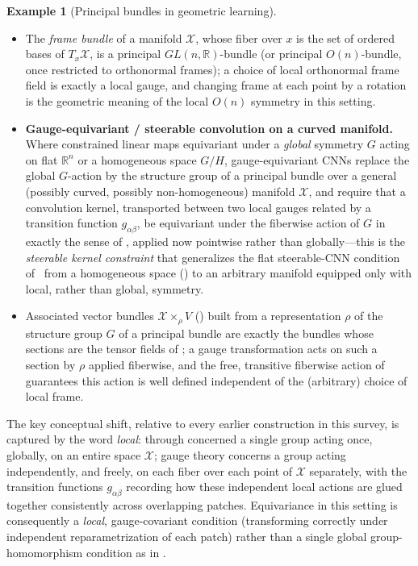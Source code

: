 \documentclass[11pt]{article}
\theoremstyle{plain}
\theoremstyle{definition}
\newtheorem{Example}{Example}[section]
\begin{document}
\begin{Example}[Principal bundles in geometric learning]
\label{ex:principal-bundles-learning}
\begin{itemize}
    \item The \emph{frame bundle} of a manifold $\mathcal{X}$, whose fiber over $x$ is
    the set of ordered bases of $T_x\mathcal{X}$, is a principal $GL(n,\mathbb{R})$-bundle
    (or principal $O(n)$-bundle, once restricted to orthonormal frames); a
    choice of local orthonormal frame field is exactly a local gauge, and
    changing frame at each point by a rotation is the geometric meaning of
    the local $O(n)$ symmetry in this setting.
    \item \textbf{Gauge-equivariant / steerable convolution on a curved
    manifold.} Where  constrained
    linear maps equivariant under a \emph{global} symmetry $G$ acting on
    flat $\mathbb{R}^n$ or a homogeneous space $G/H$, gauge-equivariant CNNs
    replace the global $G$-action by the structure group of a principal
    bundle over a general (possibly curved, possibly non-homogeneous)
    manifold $\mathcal{X}$, and require that a convolution kernel, transported between
    two local gauges related by a transition function $g_{\alpha\beta}$, be
    equivariant under the fiberwise action of $G$ in exactly the sense of
    , applied now pointwise rather than
    globally---this is the \emph{steerable kernel constraint} that
    generalizes the flat steerable-CNN condition of~\citep{weiler2019anips}
    from a homogeneous space () to an
    arbitrary manifold equipped only with local, rather than global,
    symmetry.
    \item Associated vector bundles $\mathcal{X} \times_\rho V$
    () built from a representation $\rho$
    of the structure group $G$ of a principal bundle are exactly the
    bundles whose sections are the tensor fields of
    ; a gauge transformation acts on such a
    section by $\rho$ applied fiberwise, and the free, transitive fiberwise
    action of  guarantees this action
    is well defined independent of the (arbitrary) choice of local frame.
\end{itemize}
\end{Example}

The key conceptual shift, relative to every earlier construction in this
survey, is captured by the word \emph{local}: 
through  concerned a single group acting
once, globally, on an entire space $\mathcal{X}$; gauge theory concerns a group acting
independently, and freely, on each fiber over each point of $\mathcal{X}$
separately, with the transition functions $g_{\alpha\beta}$ recording how
these independent local actions are glued together consistently across
overlapping patches. Equivariance in this setting is consequently a
\emph{local}, gauge-covariant condition (transforming correctly under
independent reparametrization of each patch) rather than a single global
group-homomorphism condition as in .
\end{document}
